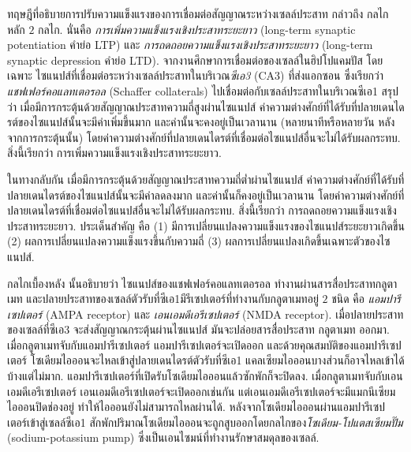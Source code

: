 {\begin{shaded}
		
		ทฤษฎีที่อธิบายการปรับความแข็งแรงของการเชื่อมต่อสัญญาณระหว่างเซลล์ประสาท
		กล่าวถึง กลไกหลัก $2$ กลไก.
		นั่นคือ \textit{การเพิ่มความแข็งแรงเชิงประสาทระยะยาว} (long-term synaptic potentiation คำย่อ LTP) และ \textit{การถดถอยความแข็งแรงเชิงประสาทระยะยาว} (long-term synaptic depression คำย่อ LTD).
		จากงานศึกษาการเชื่อมต่อของเซลล์ในฮิปโปแคมปัส โดยเฉพาะ ไซแนปส์ที่เชื่อมต่อระหว่างเซลล์ประสาทในบริเวณ\textit{ซีเอ3} (CA3) ที่ส่งแอกซอน ซึ่งเรียกว่า \textit{แชฟเฟอร์คอแลทเตอรอล} (Schaffer collaterals) ไปเชื่อมต่อกับเซลล์ประสาทในบริเวณซีเอ1 
		สรุปว่า
		เมื่อมีการกระตุ้นด้วยสัญญาณประสาทความถี่สูงผ่านไซแนปส์ ค่าความต่างศักย์ที่ได้รับที่ปลายเดนไดรต์ของไซแนปส์นั้นจะมีค่าเพิ่มขึ้นมาก และค่านั้นจะคงอยู่เป็นเวลานาน (หลายนาทีหรือหลายวัน หลังจากการกระตุ้นนั้น)
		โดยค่าความต่างศักย์ที่ปลายเดนไดรต์ที่เชื่อมต่อไซแนปส์อื่นจะไม่ได้รับผลกระทบ.
		สิ่งนี้เรียกว่า การเพิ่มความแข็งแรงเชิงประสาทระยะยาว.
		
		ในทางกลับกัน
		เมื่อมีการกระตุ้นด้วยสัญญาณประสาทความถี่ต่ำผ่านไซแนปส์ ค่าความต่างศักย์ที่ได้รับที่ปลายเดนไดรต์ของไซแนปส์นั้นจะมีค่าลดลงมาก และค่านั้นก็คงอยู่เป็นเวลานาน
		โดยค่าความต่างศักย์ที่ปลายเดนไดรต์ที่เชื่อมต่อไซแนปส์อื่นจะไม่ได้รับผลกระทบ.
		สิ่งนี้เรียกว่า การถดถอยความแข็งแรงเชิงประสาทระยะยาว.
		ประเด็นสำคัญ คือ (1) มีการเปลี่ยนแปลงความแข็งแรงของไซแนปส์ระยะยาวเกิดขึ้น
		(2) ผลการเปลี่ยนแปลงความแข็งแรงขึ้นกับความถี่
		(3) ผลการเปลี่ยนแปลงเกิดขึ้นเฉพาะตัวของไซแนปส์.
		
		กลไกเบื้องหลัง%
		นั้นอธิบายว่า
		ไซแนปส์ของแชฟเฟอร์คอแลทเตอรอล ทำงานผ่านสารสื่อประสาทกลูตาเมท
		และปลายประสาทของเซลล์ตัวรับที่ซีเอ1มีรีเซปเตอร์ที่ทำงานกับกลูตาเมทอยู่ $2$ ชนิด คือ \textit{แอมปารีเซปเตอร์} (AMPA receptor) และ \textit{เอนเอมดีเอรีเซปเตอร์} (NMDA receptor).
		เมื่อปลายประสาทของเซลล์ที่ซีเอ3 จะส่งสัญญาณกระตุ้นผ่านไซแนปส์ 
		มันจะปล่อยสารสื่อประสาท กลูตาเมท ออกมา.
		เมื่อกลูตาเมทจับกับแอมปารีเซปเตอร์ แอมปารีเซปเตอร์จะเปิดออก 
		และด้วยคุณสมบัติของแอมปารีเซปเตอร์ โซเดียมไอออนจะไหลเข้าสู่ปลายเดนไดรต์ตัวรับที่ซีเอ1
		แคลเซียมไอออนบางส่วนก็อาจไหลเข้าได้บ้างแต่ไม่มาก.
		แอมปารีเซปเตอร์ที่เปิดรับโซเดียมไอออนแล้วซักพักก็จะปิดลง.
		เมื่อกลูตาเมทจับกับเอนเอมดีเอรีเซปเตอร์ เอนเอมดีเอรีเซปเตอร์จะเปิดออกเช่นกัน แต่เอนเอมดีเอรีเซปเตอร์จะมีแมกนีเซียมไอออนปิดช่องอยู่ ทำให้ไอออนยังไม่สามารถไหลผ่านได้.
		หลังจากโซเดียมไอออนผ่านแอมปารีเซปเตอร์เข้าสู่เซลล์ซีเอ1
		สักพักปริมาณโซเดียมไอออนจะถูกสูบออกโดยกลไกของ\textit{โซเดียม-โปแตสเซียมปั๊ม} (sodium-potassium pump) ซึ่งเป็นเอนไซมน์ที่ทำงานรักษาสมดุลของเซลล์.
		

\end{shaded}}
